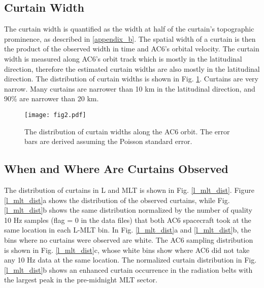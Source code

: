 \documentclass[draft]{agujournal2019}
\begin{document}
\subsection{Curtain Width}
The curtain width is quantified as the width at half of the curtain's topographic prominence, as described in \ref{appendix_b}. The spatial width of a curtain is then the product of the observed width in time and AC6's orbital velocity. The curtain width is measured along AC6's orbit track which is mostly in the latitudinal direction, therefore the estimated curtain widths are also mostly in the latitudinal direction. The distribution of curtain widths is shown in Fig. \ref{width_dist}. Curtains are very narrow. Many curtains are narrower than 10 km in the latitudinal direction, and 90\% are narrower than 20 km.

\begin{figure}
\texttt{[image: fig2.pdf]}
\caption{The distribution of curtain widths along the AC6 orbit. The error bars are derived assuming the Poisson standard error.}
\label{width_dist}
\end{figure}

\subsection{When and Where Are Curtains Observed}
The distribution of curtains in L and MLT is shown in Fig. \ref{l_mlt_dist}. Figure \ref{l_mlt_dist}a shows the distribution of the observed curtains, while Fig. \ref{l_mlt_dist}b shows the same distribution normalized by the number of quality 10 Hz samples (flag = 0 in the data files) that both AC6 spacecraft took at the same location in each L-MLT bin. In Fig. \ref{l_mlt_dist}a and \ref{l_mlt_dist}b, the bins where no curtains were observed are white. The AC6 sampling distribution is shown in Fig. \ref{l_mlt_dist}c, whose white bins show where AC6 did not take any 10 Hz data at the same location. The normalized curtain distribution in Fig. \ref{l_mlt_dist}b shows an enhanced curtain occurrence in the radiation belts  with the largest peak in the pre-midnight MLT sector. 
\end{document}
